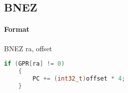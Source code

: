 \subsection{BNEZ}


\paragraph{Format} BNEZ ra, offset

\begin{lstlisting}[language=c]
    if (GPR[ra] != 0)
    {
        PC += (int32_t)offset * 4;
    }
\end{lstlisting}
